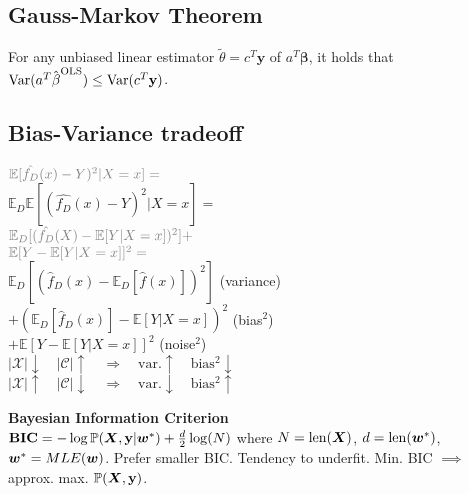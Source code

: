 \subsection*{Gauss-Markov Theorem}
For any unbiased linear estimator $\tilde{\theta} = c^T\mathbf{y}$ of $a^T\mathbf{\beta}$, it holds that $\mathrm{Var}(a^T\hat{\kern0pt \beta}^{\mathrm{OLS}}) \leq \mathrm{Var}(c^T\mathbf{y})$.

\subsection*{Bias-Variance tradeoff}
$\color{gray}\mathbb{E}[\hat{f_D}(x)-Y)^2|X=x]=$\\
$\mathbb{E}_D\mathbb{E}[(\hat{f_D}(x)-Y)^2|X=x]=$\\
$\color{gray}\mathbb{E}_D[(\hat{f_D}(X)-\mathbb{E}[Y|X=x])^2]+$\\$\color{gray}\mathbb{E}[Y-\mathbb{E}[Y|X=x]]^2=$\\
$\mathbb{E}_D[(\hat{f}_D(x)-\mathbb{E}_D[\hat{f}(x)])^2]$ (variance)\\
$+(\mathbb{E}_D[\hat{f}_D(x)]-\mathbb{E}[Y|X=x])^2$ (bias$^2$)\\
$+\mathbb{E}[Y-\mathbb{E}[Y|X=x]]^2$ (noise$^2$)\\

$|\mathcal{X}|\downarrow \quad|\mathcal{C}|\uparrow\quad\Rightarrow\quad\mathrm{var.}\uparrow\quad\mathrm{bias^2}\downarrow $\\
$|\mathcal{X}|\uparrow \quad|\mathcal{C}|\downarrow\quad\Rightarrow\quad\mathrm{var.}\downarrow\quad\mathrm{bias^2}\uparrow $

\textbf{Bayesian Information Criterion}\\
$\mathbf{BIC}=-\log\mathbb{P}({\bm{X}}, {\mathbf{y}}|{\bm{w}}^*)+\frac{d}{2}\log(N)$ where $N=\mathrm{len}({\bm{X}})$, $d=\mathrm{len}({\bm{w}}^*)$, ${\bm{w}}^*=MLE({\bm{w}})$. Prefer smaller BIC. Tendency to underfit. Min. BIC $\implies$ approx. max. $\mathbb{P}({\bm{X}}, {\mathbf{y}})$.\\